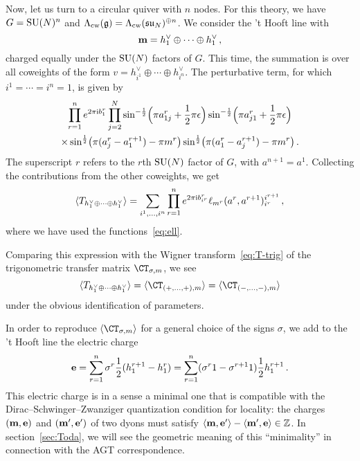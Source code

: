 Now, let us turn to a circular quiver with $n$ nodes.  For this
theory, we have $G = \mathrm{SU}(N)^n$ and
$\Lambda_{\mathrm{cw}}(\mathfrak{g}) = \Lambda_{\mathrm{cw}}(\mathfrak{su}_N)^{\oplus n}$.  We consider the 't
Hooft line with
\begin{equation}
  \label{eq:B-circular}
  \mathbf{m} =  h^\vee_1 \oplus \dotsb \oplus h^\vee_1 \,,
\end{equation}
charged equally under the $\mathrm{SU}(N)$ factors of $G$.  This time, the
summation is over all coweights of the form
$v = h^\vee_{i^1} \oplus \dotsb \oplus h^\vee_{i^n}$.  The perturbative term,
for which $i^1 = \dotsb = i^n = 1$, is given by
\begin{multline}
  \label{eq:T-circ-pert}
  \prod_{r=1}^n
  e^{2\pi\mathrm{i} b^r_1}
  \prod_{j=2}^N
  \sin^{-\frac12}\Bigl(\pi a^r_{1j} + \frac12 \pi\epsilon\Bigr)
  \sin^{-\frac12}\Bigl(\pi a^r_{j1} + \frac12 \pi\epsilon\Bigr)
  \\
  \times
  \sin^{\frac12}\bigl(\pi(a^r_j - a^{r+1}_1) - \pi m^r \bigr)
  \sin^{\frac12}\bigl(\pi(a^r_1 - a^{r+1}_j) - \pi m^r\bigr)
  \,.
\end{multline}
The superscript $r$ refers to the $r$th $\mathrm{SU}(N)$ factor of $G$, with
$a^{n+1} = a^1$.  Collecting the contributions from the other
coweights, we get
\begin{equation}
  \langle T_{h^\vee_1 \oplus \dotsb \oplus h^\vee_1} \rangle
  =
  \sum_{i^1, \dotsc, i^n}
  \prod_{r=1}^n
  e^{2\pi\mathrm{i} b^r_{i^r}}
  \ell_{m^r}(a^r, a^{r+1})_{i^r}^{i^{r+1}} \,,
\end{equation}
where we have used the functions~\eqref{eq:ell}.

Comparing this expression with the Wigner transform~\eqref{eq:T-trig}
of the trigonometric transfer matrix $\CT_{\sigma,m}$, we see
\begin{equation}
  \vev{T_{h^\vee_1 \oplus \dotsb \oplus h^\vee_1}}
  =
  \vev{\CT_{(+,\dotsc,+), m}}
  =
  \vev{\CT_{(-,\dotsc,-), m}}
\end{equation}
under the obvious identification of parameters.

In order to reproduce $\vev{\CT_{\sigma,m}}$ for a general choice of
the signs $\sigma$, we add to the 't Hooft line the electric charge
\begin{equation}
  \label{eq:E-circular}
  \mathbf{e}
  = \sum_{r=1}^n \sigma^r \frac12(h^{r+1}_1 - h^r_1)
  = \sum_{r=1}^n (\sigma^r 1 - \sigma^{r+1} 1)  \frac12 h^{r+1}_1 \,.
\end{equation}
This electric charge is in a sense a minimal one that is compatible
with the Dirac--Schwinger--Zwanziger quantization condition for
locality: the charges $(\mathbf{m},\mathbf{e})$ and
$(\mathbf{m}',\mathbf{e}')$ of two dyons must satisfy
$\langle \mathbf{m}, \mathbf{e}'\rangle - \langle \mathbf{m}',
\mathbf{e}\rangle \in \mathbb{Z}$.  In section~\ref{sec:Toda}, we will see the
geometric meaning of this ``minimality'' in connection with the AGT
correspondence.

